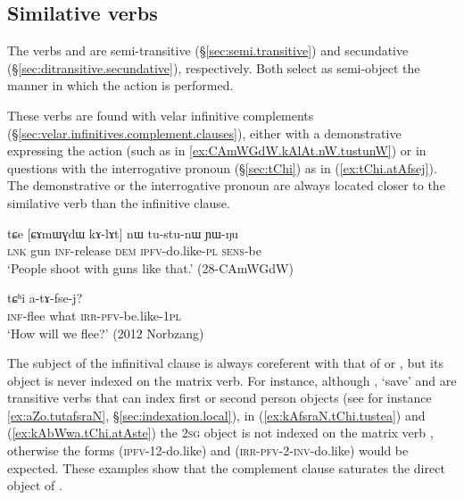 \subsection{Similative verbs}  \label{sec:similative.verb.complementation}
   
The verbs  and   are semi-transitive (§\ref{sec:semi.transitive}) and secundative (§\ref{sec:ditransitive.secundative}), respectively. Both select as semi-object the manner in which the action is performed.

These verbs are found with velar infinitive complements (§\ref{sec:velar.infinitives.complement.clauses}), either with a demonstrative expressing the action (such as  in \ref{ex:CAmWGdW.kAlAt.nW.tustunW}) or in questions with the interrogative pronoun  (§\ref{sec:tChi}) as in (\ref{ex:tChi.atAfsej}). The demonstrative or the interrogative pronoun are always located closer to the similative verb than the infinitive clause.

\begin{exe}
\ex \label{ex:CAmWGdW.kAlAt.nW.tustunW}
 \gll tɕe [ɕɤmɯɣdɯ kɤ-lɤt] nɯ tu-stu-nɯ ɲɯ-ŋu \\
 \textsc{lnk} gun \textsc{inf}-release \textsc{dem} \textsc{ipfv}-do.like-\textsc{pl} \textsc{sens}-be \\
 \glt `People shoot with guns like that.' (28-CAmWGdW)
\end{exe}

 \begin{exe}
\ex \label{ex:tChi.atAfsej}
\gll  [kɤ-pʰɣo] tɕʰi a-tɤ-fse-j?    \\
\textsc{inf}-flee what \textsc{irr}-\textsc{pfv}-be.like-\textsc{1pl} \\
\glt  `How will we flee?' (2012 Norbzang)
\end{exe} 

The subject of the infinitival clause is always coreferent with that of  or , but its object is never indexed on the matrix verb. For instance, although , `save' and  are transitive verbs that can index first or second person objects (see for instance \ref{ex:aZo.tutafsraN}, §\ref{sec:indexation.local}), in (\ref{ex:kAfsraN.tChi.tustea}) and (\ref{ex:kAbWwa.tChi.atAste})  the \textsc{2sg} object is not indexed on the matrix verb , otherwise the forms  (\textsc{ipfv}-1\fl{}2-do.like) and  (\textsc{irr}-\textsc{pfv}-2-\textsc{inv}-do.like) would be expected. These examples show that the complement clause saturates the direct object of .

